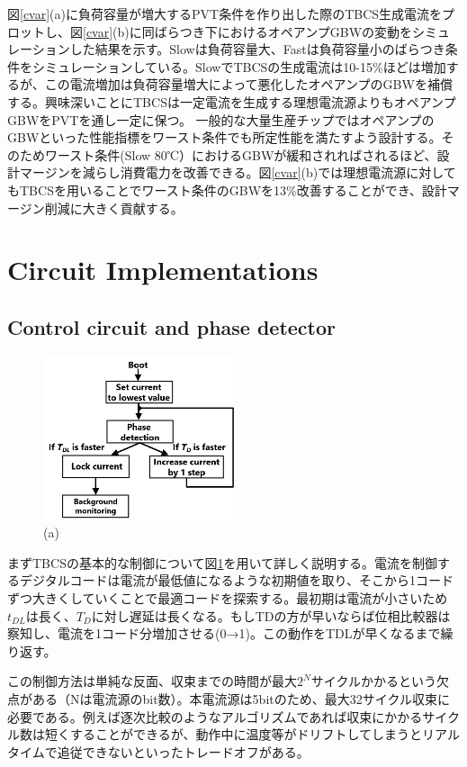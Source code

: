 \documentclass[letterpaper, 10 pt, conference]{ieeeconf}  %
\begin{document}
図\ref{cvar}(a)に負荷容量が増大するPVT条件を作り出した際のTBCS生成電流をプロットし、図\ref{cvar}(b)に同ばらつき下におけるオペアンプGBWの変動をシミュレーションした結果を示す。Slowは負荷容量大、Fastは負荷容量小のばらつき条件をシミュレーションしている。SlowでTBCSの生成電流は10-15\%ほどは増加するが、この電流増加は負荷容量増大によって悪化したオペアンプのGBWを補償する。興味深いことにTBCSは一定電流を生成する理想電流源よりもオペアンプGBWをPVTを通し一定に保つ。
一般的な大量生産チップではオペアンプのGBWといった性能指標をワースト条件でも所定性能を満たすよう設計する。そのためワースト条件(Slow 80℃）におけるGBWが緩和されればされるほど、設計マージンを減らし消費電力を改善できる。図\ref{cvar}(b)では理想電流源に対してもTBCSを用いることでワースト条件のGBWを13\%改善することができ、設計マージン削減に大きく貢献する。


\section{Circuit Implementations}
\subsection{Control circuit and phase detector}
\begin{figure}[!]
\centering
 \includegraphics[width=0.5\textwidth]{figs/flowchart.png}
  \caption{(a) 
}
\label{flow}
\end{figure}
まずTBCSの基本的な制御について図\ref{flow}を用いて詳しく説明する。電流を制御するデジタルコードは電流が最低値になるような初期値を取り、そこから1コードずつ大きくしていくことで最適コードを探索する。最初期は電流が小さいため$t_{DL}$は長く、$T_D$に対し遅延は長くなる。もしTDの方が早いならば位相比較器は察知し、電流を1コード分増加させる(0→1)。この動作をTDLが早くなるまで繰り返す。

この制御方法は単純な反面、収束までの時間が最大$2^N$サイクルかかるという欠点がある（Nは電流源のbit数）。本電流源は5bitのため、最大32サイクル収束に必要である。例えば逐次比較のようなアルゴリズムであれば収束にかかるサイクル数は短くすることができるが、動作中に温度等がドリフトしてしまうとリアルタイムで追従できないといったトレードオフがある。
\end{document}
